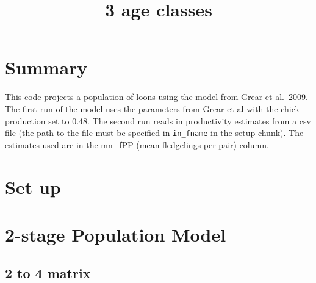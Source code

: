 \documentclass[
  letterpaper,
  DIV=11,
  numbers=noendperiod]{scrartcl}
\title{3 age classes}
\author{}
\date{}
\begin{document}
\maketitle



\section{Summary}\label{summary}

This code projects a population of loons using the model from Grear et
al.~2009. The first run of the model uses the parameters from Grear et
al with the chick production set to 0.48. The second run reads in
productivity estimates from a csv file (the path to the file must be
specified in \texttt{in\_fname} in the setup chunk). The estimates used
are in the mn\_fPP (mean fledgelings per pair) column.

\section{Set up}\label{set-up}

\section{2-stage Population Model}\label{stage-population-model}

\subsection{2 to 4 matrix}\label{to-4-matrix}
\end{document}
